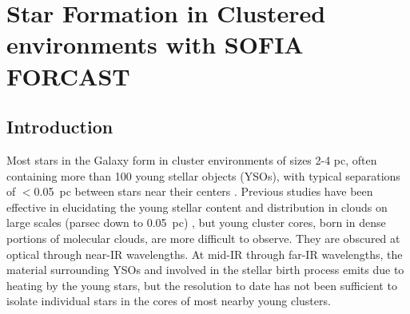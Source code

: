 \chapter{Star Formation in Clustered environments with SOFIA FORCAST}

\label{chap:SOFIA}

\section{Introduction}
Most stars in the Galaxy form in cluster environments of sizes 2-4 pc, often containing more than 100 young stellar objects (YSOs), with typical separations of $<$0.05~pc between stars near their centers \citep{Porras:2003kxa, Allen:2007wqa, Gutermuth:2009gca}.
Previous studies have been effective in elucidating the young stellar content and distribution in clouds on large scales (parsec down to 0.05~pc) \citep{Evans-ARAA2012}, but young cluster cores, born in dense portions of molecular clouds, are more difficult to observe. They are obscured at optical through near-IR wavelengths. At mid-IR through far-IR wavelengths, the material surrounding YSOs and involved in the stellar birth process emits due to heating by the young stars, but the resolution to date has not been sufficient to isolate individual stars in the cores of most nearby young clusters.





